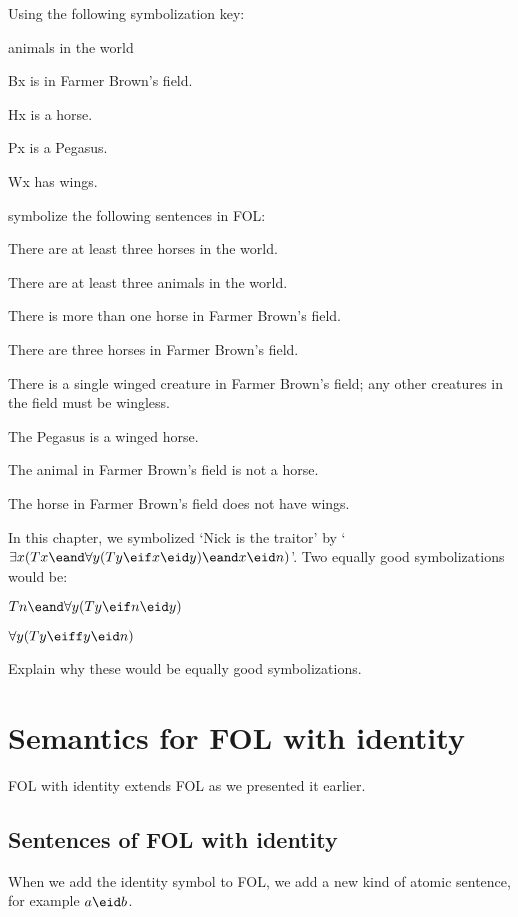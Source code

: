 \begin{practiceproblems}
\problempart Using the following symbolization key:
\begin{ekey}
\item[\text{domain}] animals in the world
\item[Bx]  is in Farmer Brown's field.
\item[Hx]  is a horse.
\item[Px]  is a Pegasus.
\item[Wx]  has wings.
\end{ekey}
symbolize the following sentences in FOL:
\begin{earg}
\item There are at least three horses in the world.
\item There are at least three animals in the world.
\item There is more than one horse in Farmer Brown's field.
\item There are three horses in Farmer Brown's field.
\item There is a single winged creature in Farmer Brown's field; any other creatures in the field must be wingless.
\item The Pegasus is a winged horse.
\item The animal in Farmer Brown's field is not a horse.
\item The horse in Farmer Brown's field does not have wings.
\end{earg}

\problempart
In this chapter, we symbolized `Nick is the traitor' by `$\exists x (Tx \eand \forall y(Ty \eif x \eid y) \eand x \eid n)$'. Two equally good symbolizations would be:
	\begin{ebullet}
		\item $Tn \eand \forall y(Ty \eif n \eid y)$
		\item $\forall y(Ty \eiff y \eid n)$
	\end{ebullet}
Explain why these would be equally good symbolizations.

\end{practiceproblems}


\chapter{Semantics for FOL with identity}
FOL with identity extends FOL as we presented it earlier.
\section{Sentences of FOL with identity}When we add the identity symbol to FOL, we add a new kind of atomic sentence, for example $a\eid b$.

